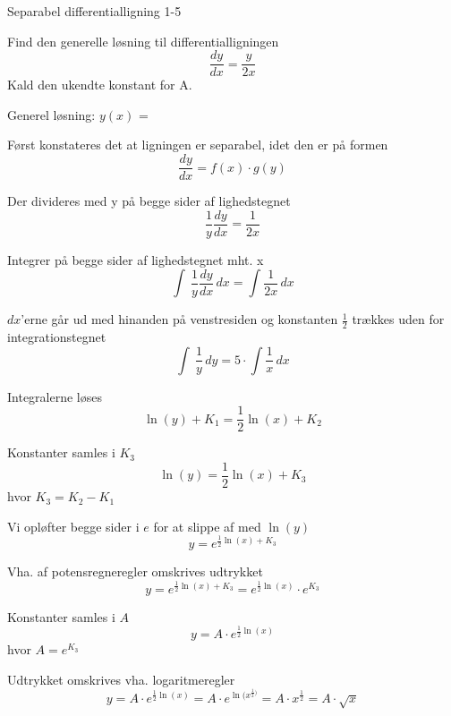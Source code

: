 \documentclass{article}
\begin{document}
\begin{exercise}{Separabel differentialligning 1-5}
	
	
	Find den generelle løsning til differentialligningen 
	\[
	\frac{dy}{dx} = \frac{y}{2x}
	\]
	Kald den ukendte konstant for A.
	
	Generel løsning: $y(x)$ = 
	
	\hint
	
	Først konstateres det at ligningen er separabel, idet den er på formen
	\[
	\frac{dy}{dx} = f(x) \cdot g(y)
	\]
	
	\hint 
	Der divideres med y på begge sider af lighedstegnet
	\[
	\frac{1}{y} \frac{dy}{dx} = \frac{1}{2x}
	\]
	
	\hint
	
	Integrer på begge sider af lighedstegnet mht. x
	\[
	\int\ \frac{1}{y} \frac{dy}{dx} \, dx= \int \frac{1}{2x} \,dx
	\]
	
	\hint
	
	$dx$'erne går ud med hinanden på venstresiden og konstanten $\frac{1}{2}$ trækkes uden for integrationstegnet
	\[
	\int\ \frac{1}{y}\, dy= 5 \cdot \int \frac{1}{x}\,dx
	\]
	
	\hint
	
	Integralerne løses
	\[
	\ln(y) + K_1 =\frac{1}{2} \ln(x) + K_2
	\]
	
	
	\hint
	
	Konstanter samles i $K_3$
	\[
	\ln(y) =\frac{1}{2} \ln(x) + K_3
	\]
	hvor $K_3=K_2-K_1$
	
	\hint 
	
	Vi opløfter begge sider i $e$ for at slippe af med $\ln(y)$
	\[
	y = e^{\frac{1}{2} \ln(x) + K_3}
	\]
	
	\hint
	
	Vha.  af potensregneregler omskrives udtrykket
	\[
	y = e^{\frac{1}{2} \ln(x) + K_3} = e^{\frac{1}{2} \ln(x)}  \cdot e^{K_3}
	\]
	
	\hint
	
	Konstanter samles i $A$
	\[
	y = A \cdot e^{\frac{1}{2} \ln(x)}
	\]
	hvor $ A= e^{K_3}$
	
	\hint 
	
	Udtrykket omskrives vha. logaritmeregler
	\[
	y = A \cdot e^{\frac{1}{2} \ln(x)} = A \cdot e^{\ln(x^{\frac{1}{2})}} = A \cdot x^{\frac{1}{2}} = A \cdot \sqrt{x}
	\]
	
\end{exercise}
\end{document}
